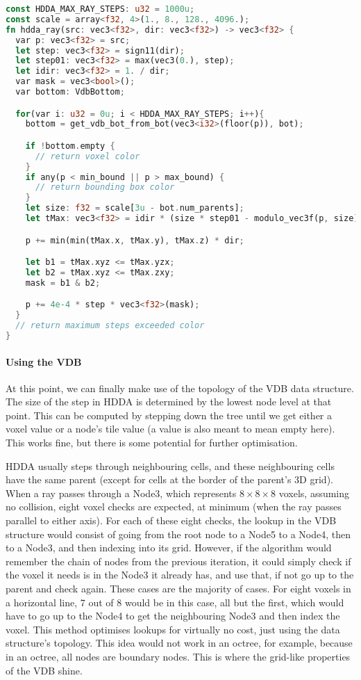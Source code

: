 \begin{lstlisting}[language=rust, captionpos=b, caption={\texttt{HDDA} algorithm}, label={hdda:code}]
const HDDA_MAX_RAY_STEPS: u32 = 1000u;
const scale = array<f32, 4>(1., 8., 128., 4096.);
fn hdda_ray(src: vec3<f32>, dir: vec3<f32>) -> vec3<f32> {
  var p: vec3<f32> = src;
  let step: vec3<f32> = sign11(dir);
  let step01: vec3<f32> = max(vec3(0.), step);
  let idir: vec3<f32> = 1. / dir;
  var mask = vec3<bool>();
  var bottom: VdbBottom;

  for(var i: u32 = 0u; i < HDDA_MAX_RAY_STEPS; i++){
    bottom = get_vdb_bot_from_bot(vec3<i32>(floor(p)), bot);

    if !bottom.empty {
      // return voxel color
    }
    if any(p < min_bound || p > max_bound) {
      // return bounding box color
    }
    let size: f32 = scale[3u - bot.num_parents];
    let tMax: vec3<f32> = idir * (size * step01 - modulo_vec3f(p, size));

    p += min(min(tMax.x, tMax.y), tMax.z) * dir;

    let b1 = tMax.xyz <= tMax.yzx;
    let b2 = tMax.xyz <= tMax.zxy;
    mask = b1 & b2;

    p += 4e-4 * step * vec3<f32>(mask);
  }
  // return maximum steps exceeded color
}
\end{lstlisting}

\paragraph{Using the VDB}
At this point, we can finally make use of the topology of the VDB data structure.
The size of the step in HDDA is determined by the lowest node level at that point.
This can be computed by stepping down the tree until we get either a voxel value or a node's tile value (a value is also meant to mean empty here).
This works fine, but there is some potential for further optimisation.

HDDA usually steps through neighbouring cells, and these neighbouring cells have the same parent (except for cells at the border of the parent's 3D grid).
When a ray passes through a Node3, which represents $8\times8\times8$ voxels, assuming no collision, eight voxel checks are expected, at minimum (when the ray passes parallel to either axis).
For each of these eight checks, the lookup in the VDB structure would consist of going from the root node to a Node5 to a Node4, then to a Node3, and then indexing into its grid.
However, if the algorithm would remember the chain of nodes from the previous iteration, it could simply check if the voxel it needs is in the Node3 it already has, and use that, if not go up to the parent and check again. These cases are the majority of cases. For eight voxels in a horizontal line, 7 out of 8 would be in this case,
all but the first, which would have to go up to the Node4 to get the neighbouring Node3 and then index the voxel.
This method optimises lookups for virtually no cost, just using the data structure's topology. This idea would not work in an octree, for example, because in an octree, all nodes are boundary nodes.
This is where the grid-like properties of the VDB shine.

